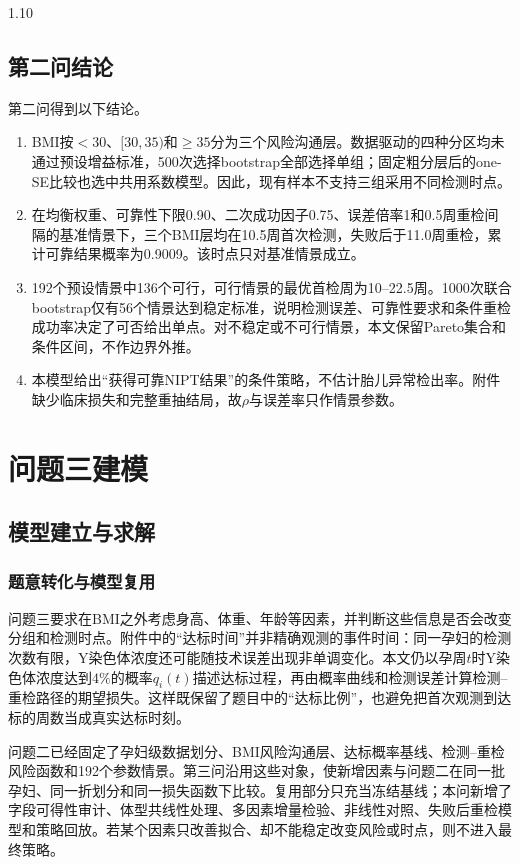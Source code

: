 \documentclass[12pt,a4paper]{ctexrep}
\numberwithin{equation}{section}
\begin{document}
\begin{spacing}{1.10}
{			\subsection{第二问结论}
			第二问得到以下结论。
			\begin{enumerate}[label=\arabic*),itemsep=0pt,topsep=2pt]
			\item BMI按$<30$、$[30,35)$和$\geq35$分为三个风险沟通层。数据驱动的四种分区均未通过预设增益标准，500次选择bootstrap全部选择单组；固定粗分层后的one-SE比较也选中共用系数模型。因此，现有样本不支持三组采用不同检测时点。
			\item 在均衡权重、可靠性下限0.90、二次成功因子0.75、误差倍率1和0.5周重检间隔的基准情景下，三个BMI层均在10.5周首次检测，失败后于11.0周重检，累计可靠结果概率为0.9009。该时点只对基准情景成立。
			\item 192个预设情景中136个可行，可行情景的最优首检周为10--22.5周。1000次联合bootstrap仅有56个情景达到稳定标准，说明检测误差、可靠性要求和条件重检成功率决定了可否给出单点。对不稳定或不可行情景，本文保留Pareto集合和条件区间，不作边界外推。
			\item 本模型给出“获得可靠NIPT结果”的条件策略，不估计胎儿异常检出率。附件缺少临床损失和完整重抽结局，故$\rho$与误差率只作情景参数。
			\end{enumerate}

			\section{问题三建模}
			\subsection{模型建立与求解}
			\subsubsection{题意转化与模型复用}
			问题三要求在BMI之外考虑身高、体重、年龄等因素，并判断这些信息是否会改变分组和检测时点。附件中的“达标时间”并非精确观测的事件时间：同一孕妇的检测次数有限，Y染色体浓度还可能随技术误差出现非单调变化。本文仍以孕周$t$时Y染色体浓度达到$4\%$的概率$q_i(t)$描述达标过程，再由概率曲线和检测误差计算检测--重检路径的期望损失。这样既保留了题目中的“达标比例”，也避免把首次观测到达标的周数当成真实达标时刻。

			问题二已经固定了孕妇级数据划分、BMI风险沟通层、达标概率基线、检测--重检风险函数和192个参数情景。第三问沿用这些对象，使新增因素与问题二在同一批孕妇、同一折划分和同一损失函数下比较。复用部分只充当冻结基线；本问新增了字段可得性审计、体型共线性处理、多因素增量检验、非线性对照、失败后重检模型和策略回放。若某个因素只改善拟合、却不能稳定改变风险或时点，则不进入最终策略。

}
\end{spacing}
\end{document}
